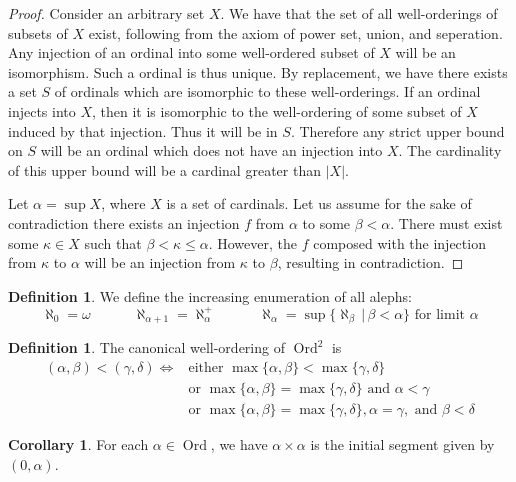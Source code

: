 \documentclass{article}
\theoremstyle{definition}
\newtheorem{crly}[thm]{Corollary}
\newtheorem{defn}[thm]{Definition}
\DeclareMathOperator{\Ord}{Ord}
\newcommand{\abs}[1]{\lvert#1\rvert}
\begin{document}
\begin{proof}
    Consider an arbitrary set $X$. We have that the set of all well-orderings of subsets of $X$ exist, following from the axiom of power set, union, and seperation. Any injection of an ordinal into some well-ordered subset of $X$ will be an isomorphism. Such a ordinal is thus unique. By replacement, we have there exists a set $S$ of ordinals which are isomorphic to these well-orderings. If an ordinal injects into $X$, then it is isomorphic to the well-ordering of some subset of $X$ induced by that injection. Thus it will be in $S$. Therefore any strict upper bound on $S$ will be an ordinal which does not have an injection into $X$. The cardinality of this upper bound will be a cardinal greater than $\abs{X}$.

    Let $\alpha = \sup X$, where $X$ is a set of cardinals. Let us assume for the sake of contradiction there exists an injection $f$ from $\alpha$ to some $\beta < \alpha$. There must exist some $\kappa \in X$  such that $\beta < \kappa \le \alpha$. However, the $f$ composed with the injection from $\kappa$ to $\alpha$ will be an injection from $\kappa$ to $\beta$, resulting in contradiction.
\end{proof}

\begin{defn}
    We define the increasing enumeration of all alephs:
    \[
        \aleph_0 = \omega \quad\quad\quad
        \aleph_{\alpha + 1} = \aleph_{\alpha}^+
        \quad\quad\quad
        \aleph_{\alpha} = \sup\{\aleph_{\beta} \, | \, \beta < \alpha \} \text{ for limit $\alpha$}    
    \]
\end{defn}

\begin{defn}
    The canonical well-ordering of $\Ord^2$ is 
    \begin{align*}
        (\alpha, \beta) < (\gamma, \delta) \iff & \text{either } \max\{\alpha, \beta\} < \max\{\gamma, \delta\}
        \\
        & \text{or } \max\{\alpha, \beta\} = \max\{\gamma, \delta\} \text{ and } \alpha < \gamma
        \\
        & \text{or } \max\{\alpha, \beta\} = \max\{\gamma, \delta\}, \alpha = \gamma, \text{ and } \beta < \delta
    \end{align*}
\end{defn}

\begin{crly}
    For each $\alpha \in \Ord$, we have $\alpha \times \alpha$ is the initial segment given by $(0, \alpha)$.
\end{crly}
\end{document}
